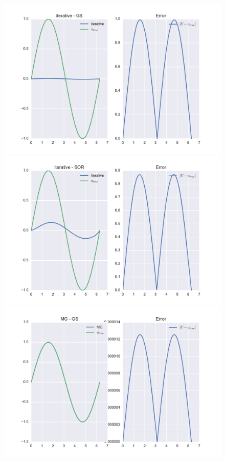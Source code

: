 \documentclass[pdftex,12pt,a4paper]{article}
\begin{document}
        \begin{figure}[h]
            \centering
            \includegraphics[scale=.4]{../plots/gs_sol_1d.pdf}
            \includegraphics[scale=.4]{../plots/sor_sol_1d.pdf} \\
            \includegraphics[scale=.4]{../plots/v_sol_1d.pdf}

\end{figure}
\end{document}
